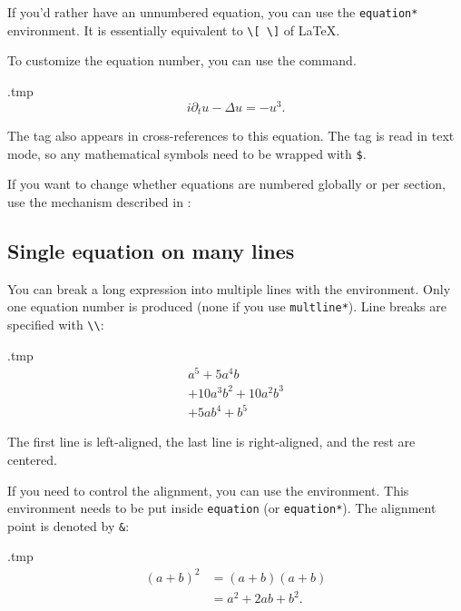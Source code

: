 If you'd rather have an unnumbered equation,
you can use the \verb|equation*| environment.
It is essentially equivalent to \verb|\[ \]| of \LaTeX.

To customize the equation number, you can use the  command.
%
\begin{VerbatimOut}{\jobname.tmp}
\begin{equation}
i \partial_t u - \Delta u = -u^3.
\tag{NLS}
\end{equation}
\end{VerbatimOut}
\ShowExample
%
The tag also appears in cross-references to this equation.
The tag is read in text mode, so any mathematical symbols need to be wrapped with \verb|$|.

If you want to change whether equations are numbered globally or per section,
use the  mechanism described in :
%
\begin{ExampleCode}
\end{ExampleCode}


%
%
\subsection{Single equation on many lines}\label{sec:math split}

You can break a long expression into multiple lines with the  environment.
Only one equation number is produced (none if you use \verb|multline*|).
Line breaks are specified with \verb|\\|:
%
\begin{VerbatimOut}{\jobname.tmp}
\begin{multline}
a^5 + 5 a^4 b \\
+ 10 a^3 b^2 + 10 a^2 b^3\\
+ 5 a b^4 + b^5
\end{multline}
\end{VerbatimOut}
\ShowExample
%
The first line is left-aligned, the last line is right-aligned,
and the rest are centered.

If you need to control the alignment,
you can use the  environment.
This environment needs to be put inside \verb|equation| (or \verb|equation*|).
The alignment point is denoted by \verb|&|:
%
\begin{VerbatimOut}{\jobname.tmp}
\begin{equation}
\begin{split}
(a+b)^2
&= (a+b)(a+b)\\
&= a^2 + 2ab + b^2.
\end{split}
\end{equation}
\end{VerbatimOut}
\ShowExample

